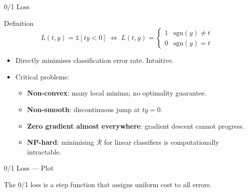 \begin{frame}{0/1 Loss}
  \begin{block}{Definition}
    \[
      L(t,y) = \mathbb{1}[ty<0]
      \;\Leftrightarrow\;
      L(t,y) = \begin{cases} 1 & \mathrm{sgn}(y)\neq t\\ 0 & \mathrm{sgn}(y)=t \end{cases}
    \]
  \end{block}
  \begin{itemize}
    \item Directly minimises classification error rate. Intuitive.
    \item \textcolor{AlertRed}{Critical problems}:
      \begin{itemize}
        \item \textbf{Non-convex}: many local minima; no optimality guarantee.
        \item \textbf{Non-smooth}: discontinuous jump at $ty=0$.
        \item \textbf{Zero gradient almost everywhere}: gradient descent cannot progress.
        \item \textbf{NP-hard}: minimising $\overline{\mathcal{R}}$ for linear classifiers is computationally intractable.
      \end{itemize}
  \end{itemize}
\end{frame}

\begin{frame}{0/1 Loss — Plot}
  \begin{center}
  \end{center}
  \small The 0/1 loss is a step function that assigns uniform cost to all errors.
\end{frame}


